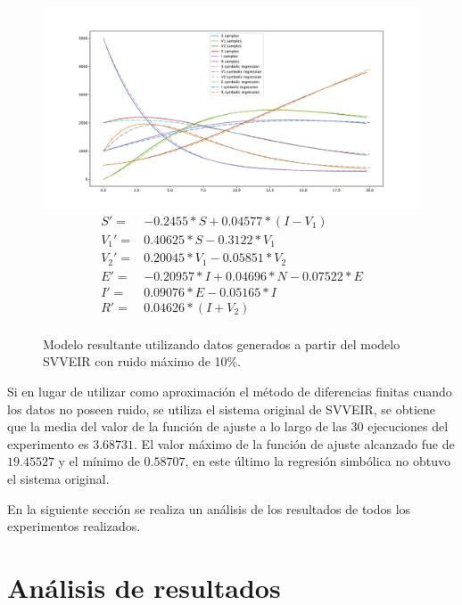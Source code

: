 \begin{figure}[h]
    \centering
    \includegraphics[width=\textwidth]{"figures/final_plot_SVVEIR_0.1.pdf"}
    \begin{align*}
        S' =   & -0.2455 * S + 0.04577 * (I - V_1)       \\
        V_1' = & 0.40625 * S -0.3122 * V_1               \\
        V_2' = & 0.20045 * V_1 -0.05851 * V_2            \\
        E' =   & -0.20957 * I + 0.04696 * N -0.07522 * E \\
        I' =   & 0.09076 * E -0.05165 * I                \\
        R' =   & 0.04626 * (I + V_2)                     \\
    \end{align*}
    \caption{Modelo resultante utilizando datos generados a partir del modelo SVVEIR con ruido máximo de 10\%.}
    \label{fig:final_plot_SVVEIR_0.1}
\end{figure}

Si en lugar de utilizar como aproximación el método de diferencias finitas cuando los datos no poseen ruido, se utiliza el sistema original de SVVEIR, se obtiene que la media del valor de la función de ajuste a lo largo de las 30 ejecuciones del experimento es $3.68731$. El valor máximo de la función de ajuste alcanzado fue de $19.45527$ y el mínimo de $0.58707$, en este último la regresión simbólica no obtuvo el sistema original.

En la siguiente sección se realiza un análisis de los resultados de todos los experimentos realizados.

\section{Análisis de resultados}\label{section:experiments_results}

